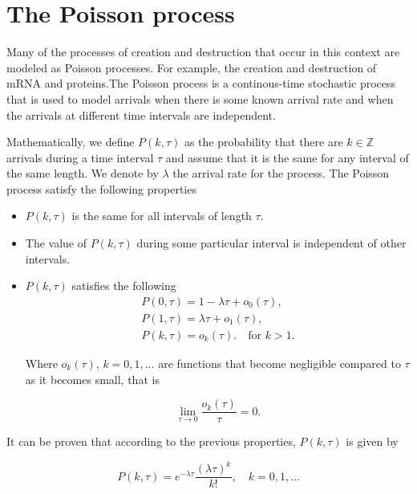 \section{The Poisson process}

Many of the processes of creation and destruction that occur in this context are modeled as Poisson processes. For example, the creation and destruction of mRNA and proteins.The Poisson process is a continous-time stochastic process that is used to model arrivals when there is some known arrival rate and when the arrivals at different time intervals are independent.

Mathematically, we define $P(k,\tau)$ as the probability that there are $k\in\mathbb{Z}$ arrivals during a time interval $\tau$ and assume that it is the same for any interval of the same length. We denote by $\lambda$ the arrival rate for the process. The Poisson process satisfy the following properties

\begin{itemize}
  \item  $P(k,\tau)$ is the same for all intervals of length $\tau$.
  \item  The value of $P(k,\tau)$ during some particular interval is independent of other intervals.
  \item $P(k,\tau)$ satisfies the following
    \begin{equation*}
      \begin{split}
        P(0,\tau)=1-\lambda\tau+o_0(\tau),\\
        P(1,\tau)=\lambda\tau+o_1(\tau),\\
        P(k,\tau)=o_k(\tau).\quad\text{for } k>1.
      \end{split}
    \end{equation*}
    
    Where $o_k(\tau)$, $k=0,1,\dotsc$ are functions that become negligible compared to $\tau$ as it becomes small, that is

    \begin{equation*}
      \lim_{\tau\to 0}\frac{o_k(\tau)}{\tau}=0.
    \end{equation*}
\end{itemize}

It can be proven that according to the previous properties, $P(k,\tau)$ is given by


\begin{equation*}
  P(k,\tau) = e^{-\lambda\tau}\frac{(\lambda\tau)^k}{k!},\quad k=0,1,\dotsc
\end{equation*}

